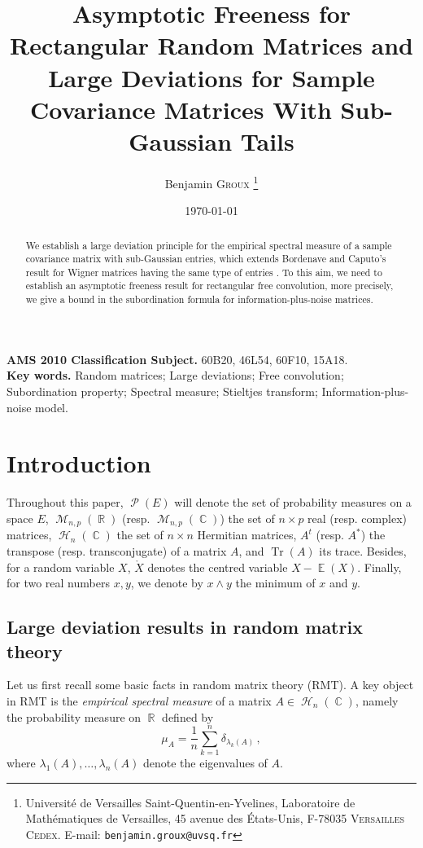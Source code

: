 \documentclass[11pt,a4paper]{article}
\title{Asymptotic Freeness for Rectangular Random Matrices and Large Deviations for Sample Covariance Matrices With Sub-Gaussian Tails}
\author{Benjamin \textsc{Groux} \footnote{Universit\'e de Versailles Saint-Quentin-en-Yvelines, Laboratoire de Math\'ematiques de Versailles, 45 avenue des \'Etats-Unis, F-78035 \textsc{Versailles Cedex}. E-mail: \texttt{benjamin.groux@uvsq.fr} } }
\date{\today}
\DeclareMathOperator{\E}{\mathbb{E}}
\DeclareMathOperator{\R}{\mathbb{R}}
\DeclareMathOperator{\C}{\mathbb{C}}
\DeclareMathOperator{\HH}{\mathcal{H}}
\DeclareMathOperator{\MM}{\mathcal{M}}
\DeclareMathOperator{\PP}{\mathcal{P}}
\DeclareMathOperator{\1}{\mathbf{1}}
\DeclareMathOperator{\Tr}{\mathrm{Tr}}
\theoremstyle{definition}
\begin{document}
\maketitle


\begin{abstract}
We establish a large deviation principle for the empirical spectral measure of a sample covariance matrix with sub-Gaussian entries, which extends Bordenave and Caputo's result for Wigner matrices having the same type of entries \cite{BC}. To this aim, we need to establish an asymptotic freeness result for rectangular free convolution, more precisely, we give a bound in the subordination formula for information-plus-noise matrices.\\
\end{abstract}

\textbf{AMS 2010 Classification Subject.} 60B20, 46L54, 60F10, 15A18.\\

\textbf{Key words.} Random matrices; Large deviations; Free convolution; Subordination property; Spectral measure; Stieltjes transform; Information-plus-noise model.


\tableofcontents




\section{Introduction}

Throughout this paper, $\PP(E)$ will denote the set of probability measures on a space $E$, $\MM_{n,p}(\R)$ (resp. $\MM_{n,p}(\C)$) the set of $n \times p$ real (resp. complex) matrices, $\HH_n(\C)$ the set of $n \times n$ Hermitian matrices, $A^t$ (resp. $A^*$) the transpose (resp. transconjugate) of a matrix $A$, and $\Tr(A)$ its trace. Besides, for a random variable $X$, $\mathring{X}$ denotes the centred variable $X-\E(X)$. Finally, for two real numbers $x,y$, we denote by $x \wedge y$ the minimum of $x$ and $y$.


\subsection{Large deviation results in random matrix theory}

Let us first recall some basic facts in random matrix theory (RMT). A key object in RMT is the \emph{empirical spectral measure} of a matrix $A \in \HH_n(\C)$, namely the probability measure on $\R$ defined by
\begin{displaymath}
\mu_A = \frac1n \sum_{k=1}^n \delta_{\lambda_k(A)} \, ,
\end{displaymath}
where $\lambda_1(A),\ldots,\lambda_n(A)$ denote the eigenvalues of $A$.
\end{document}
